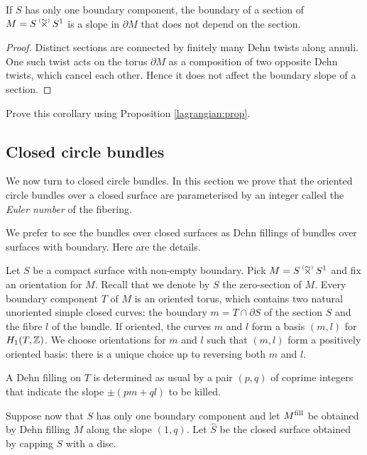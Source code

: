 \begin{cor} \label{unique:cor}
If $S$ has only one boundary component, the boundary of a section of $M=S\timforsetil S^1$ is a slope in $\partial M$ that does not depend on the section.
\end{cor}
\begin{proof}
Distinct sections are connected by finitely many Dehn twists along annuli. One such twist acts on the torus $\partial M$ as a composition of two opposite Dehn twists, which cancel each other. Hence it does not affect the boundary slope of a section.
\end{proof}

\begin{ex} Prove this corollary using Proposition \ref{lagrangian:prop}.
\end{ex}

\subsection{Closed circle bundles} \label{closed:circle:subsection}
We now turn to closed circle bundles. In this section we prove that 
the oriented circle bundles over a closed surface are parameterised by an integer called the \emph{Euler number} of the fibering.

We prefer to see the bundles over closed surfaces as Dehn fillings of bundles over surfaces with boundary. Here are the details.

Let $S$ be a compact surface with non-empty boundary. Pick $M=S\timforsetil S^1$ and fix an orientation for $M$. Recall that we denote by $S$ the zero-section of $M$. Every boundary component $T$ of $M$ is an oriented torus, which contains two natural unoriented simple closed curves: the boundary $m=T\cap \partial S$ of the section $S$ and the fibre $l$ of the bundle. If oriented, the curves $m$ and $l$ form a basis $(m,l)$ for $H_1(T,\mathbb{Z})$. We choose orientations for $m$ and $l$ such that $(m,l)$ form a positively oriented basis: there is a unique choice up to reversing both $m$ and $l$.

A Dehn filling on $T$ is determined as usual by a pair $(p,q)$ of coprime integers that indicate the slope $\pm (pm+ql)$ to be killed. 

Suppose now that $S$ has only one boundary component and let $M^{\rm fill}$ be obtained by Dehn filling $M$ along the slope $(1,q)$. Let $\hat S$ be the closed surface obtained by capping $S$ with a disc.

